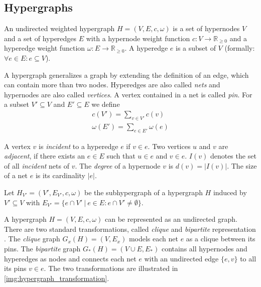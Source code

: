 \subsection{Hypergraphs}
\label{sec:hypergraph}

\begin{definition}
An undirected weighted hypergraph $H = (V,E,c,\omega)$ is a set of hypernodes $V$ 
and a set of hyperedges $E$ with a hypernode weight function 
$c: V \rightarrow \mathbb{R}_{\ge 0}$ and a hyperedge weight 
function $\omega: E \rightarrow \mathbb{R}_{\ge 0}$. A hyperedge $e$ 
is a subset of $V$ (formally: $\forall e \in E: e \subseteq V$).
\label{def:hypergraph}
\end{definition}

A hypergraph generalizes a graph by extending the definition of an edge, which 
can contain more than two nodes. Hyperedges are also called \emph{nets} and hypernodes are
also called \emph{vertices}. A vertex contained in a net is called \emph{pin}. 
For a subset $V' \subseteq V$ and $E' \subseteq E$ we
define
\begin{align*}
c(V') = \sum_{v \in V'} c(v) \\
\omega(E') = \sum_{e \in E'} \omega(e)
\end{align*}

A vertex $v$ is \emph{incident} to a hyperedge $e$ if $v \in e$.
Two vertices $u$ and $v$ are \emph{adjacent}, if there exists an 
$e \in E$ such that $u \in e$ and $v \in e$. $I(v)$ denotes the set of all 
\emph{incident} nets of $v$. The \emph{degree} of a hypernode 
$v$ is $d(v) = |I(v)|$. The size of a net $e$ is its cardinality $|e|$.

\begin{definition}
Let $H_{V'} = (V',E_{V'},c,\omega)$ be the subhypergraph of a hypergraph $H$
induced by $V' \subseteq V$ with $E_{V'} = \{e \cap V'\ |\ e \in E: e 
\cap V' \neq \emptyset\}$.
\label{def:subhypergraph}
\end{definition}

A hypergraph $H = (V,E,c,\omega)$ can be represented as an undirected graph. 
There are two standard transformations, called \emph{clique} and \emph{bipartite} 
representation \cite{HuMoerder85}. The \emph{clique} graph $G_x(H) = (V,E_x)$ models
each net $e$ as a clique between its pins. The \emph{bipartite} graph $G_*(H) = 
(V \cup E, E_*)$ contains all hypernodes and hyperedges as nodes and connects each
net $e$ with an undirected edge $\{e,v\}$ to all its pins $v \in e$. The two transformations
are illustrated in \autoref{img:hypergraph_transformation}.

